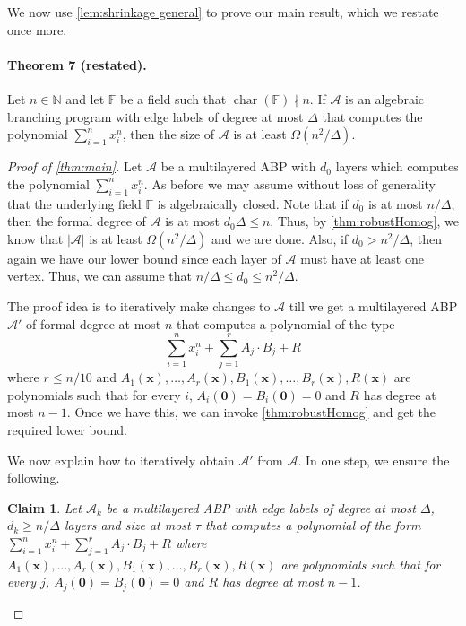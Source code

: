 \documentclass[10pt,a4paper]{article}
\newtheorem{claim}[theorem]{Claim}
\newcommand{\F}{\mathbb F}
\newcommand{\N}{\mathbb N}
\newcommand{\vx}{\mathbf x}
\DeclareMathOperator{\Char}{char}
\newcommand{\abs}[1]{\left|#1\right|}
\begin{document}
We now use \autoref{lem:shrinkage general} to prove our main result, which we restate once more.
\paragraph{Theorem 7 (restated).} Let $n\in\N$ and let $\F$ be a field such that $\Char(\F)\nmid n$. If $\mathcal A$ is an algebraic branching program with edge labels of degree at most $\Delta$ that computes the polynomial $\sum_{i=1}^n x_i^n$, then the size of $\mathcal A$ is at least $\Omega(n^2/\Delta)$.
 
	
\begin{proof}[Proof of \autoref{thm:main}]
	Let $\mathcal{A}$ be a multilayered ABP with $d_0$ layers which computes the polynomial $\sum_{i = 1}^n x_i^n$. As before we may assume without loss of generality that the underlying field $\F$ is algebraically closed. Note that if $d_0$ is at most $n/\Delta$, then the formal degree of $\mathcal A$ is at most $d_0\Delta\le n$. Thus, by \autoref{thm:robustHomog}, we know that $\abs{\mathcal A}$ is at least $\Omega(n^2/\Delta)$ and we are done. Also, if $d_0 > n^2/\Delta$, then again we have our lower bound since each layer of $\mathcal{A}$ must have at least one vertex. Thus, we can assume that $n/\Delta \le d_0 \le n^2/\Delta$. 
		
	The proof idea is to iteratively make changes to $\mathcal{A}$ till we get a multilayered ABP $\mathcal{A}'$ of formal degree at most $n$ that computes a polynomial of the type 
	\[\sum_{i = 1}^n x_i^n + \sum_{j = 1}^r A_j\cdot B_j + R\]
	where $r \leq n/10$ and $A_1(\vx), \ldots, A_r(\vx), B_1(\vx), \ldots, B_r(\vx), R(\vx)$ are polynomials such that for every $i$, $A_i(\mathbf{0}) = B_i(\mathbf{0}) = 0$ and $R$ has degree at most $n-1$. 
	Once we have this, we can invoke \autoref{thm:robustHomog} and get the required lower bound.
		
	We now explain how to iteratively obtain $\mathcal{A}'$ from $\mathcal{A}$. In one step, we ensure the following.
		
	\begin{claim}\label{clm:oneStep}
		Let $\mathcal{A}_k$ be a multilayered ABP with edge labels of degree at most $\Delta$, $d_k \ge n/\Delta$ layers and size at most $\tau$ that computes a polynomial of the form $\sum_{i = 1}^n x_i^n + \sum_{j = 1}^r A_j\cdot B_j + R$ where $A_1(\vx), \ldots, A_r(\vx), B_1(\vx), \ldots, B_r(\vx), R(\vx)$ are polynomials such that for every $j$, $A_j(\mathbf{0}) = B_j(\mathbf{0}) = 0$ and $R$ has degree at most $n-1$.
			

\end{claim}
\end{proof}
\end{document}
